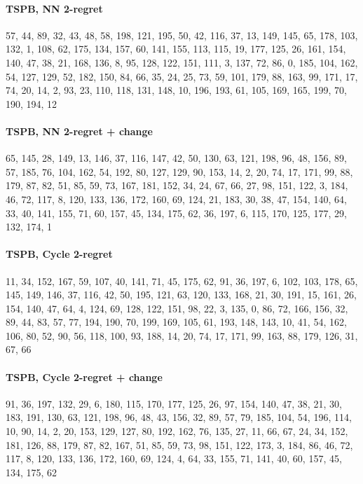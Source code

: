 \paragraph{TSPB, NN 2-regret}
{\footnotesize\ttfamily\raggedright 57, 44, 89, 32, 43, 48, 58, 198, 121, 195, 50, 42, 116, 37, 13, 149, 145, 65, 178, 103, 132, 1, 108, 62, 175, 134, 157, 60, 141, 155, 113, 115, 19, 177, 125, 26, 161, 154, 140, 47, 38, 21, 168, 136, 8, 95, 128, 122, 151, 111, 3, 137, 72, 86, 0, 185, 104, 162, 54, 127, 129, 52, 182, 150, 84, 66, 35, 24, 25, 73, 59, 101, 179, 88, 163, 99, 171, 17, 74, 20, 14, 2, 93, 23, 110, 118, 131, 148, 10, 196, 193, 61, 105, 169, 165, 199, 70, 190, 194, 12\par}

\paragraph{TSPB, NN 2-regret + change}
{\footnotesize\ttfamily\raggedright 65, 145, 28, 149, 13, 146, 37, 116, 147, 42, 50, 130, 63, 121, 198, 96, 48, 156, 89, 57, 185, 76, 104, 162, 54, 192, 80, 127, 129, 90, 153, 14, 2, 20, 74, 17, 171, 99, 88, 179, 87, 82, 51, 85, 59, 73, 167, 181, 152, 34, 24, 67, 66, 27, 98, 151, 122, 3, 184, 46, 72, 117, 8, 120, 133, 136, 172, 160, 69, 124, 21, 183, 30, 38, 47, 154, 140, 64, 33, 40, 141, 155, 71, 60, 157, 45, 134, 175, 62, 36, 197, 6, 115, 170, 125, 177, 29, 132, 174, 1\par}

\paragraph{TSPB, Cycle 2-regret}
{\footnotesize\ttfamily\raggedright 11, 34, 152, 167, 59, 107, 40, 141, 71, 45, 175, 62, 91, 36, 197, 6, 102, 103, 178, 65, 145, 149, 146, 37, 116, 42, 50, 195, 121, 63, 120, 133, 168, 21, 30, 191, 15, 161, 26, 154, 140, 47, 64, 4, 124, 69, 128, 122, 151, 98, 22, 3, 135, 0, 86, 72, 166, 156, 32, 89, 44, 83, 57, 77, 194, 190, 70, 199, 169, 105, 61, 193, 148, 143, 10, 41, 54, 162, 106, 80, 52, 90, 56, 118, 100, 93, 188, 14, 20, 74, 17, 171, 99, 163, 88, 179, 126, 31, 67, 66\par}

\paragraph{TSPB, Cycle 2-regret + change}
{\footnotesize\ttfamily\raggedright 91, 36, 197, 132, 29, 6, 180, 115, 170, 177, 125, 26, 97, 154, 140, 47, 38, 21, 30, 183, 191, 130, 63, 121, 198, 96, 48, 43, 156, 32, 89, 57, 79, 185, 104, 54, 196, 114, 10, 90, 14, 2, 20, 153, 129, 127, 80, 192, 162, 76, 135, 27, 11, 66, 67, 24, 34, 152, 181, 126, 88, 179, 87, 82, 167, 51, 85, 59, 73, 98, 151, 122, 173, 3, 184, 86, 46, 72, 117, 8, 120, 133, 136, 172, 160, 69, 124, 4, 64, 33, 155, 71, 141, 40, 60, 157, 45, 134, 175, 62\par}
